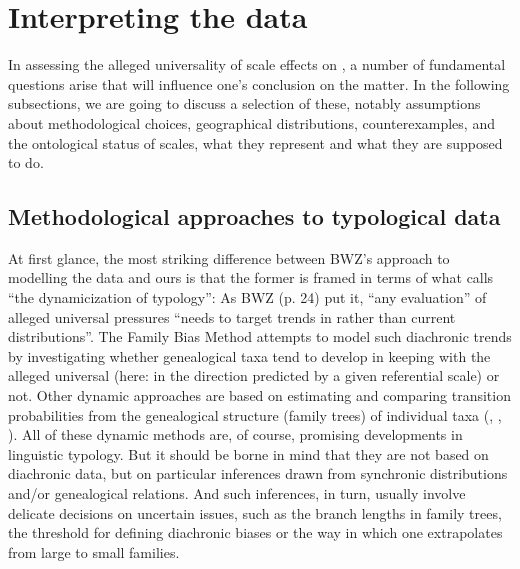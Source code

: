 \documentclass[output=paper]{langscibook}
\begin{document}
\section{Interpreting the data}
\label{18-sc-sec:4}

In assessing the alleged universality of scale effects on , a number of fundamental questions arise that will influence one’s conclusion on the matter. In the following subsections, we are going to discuss a selection of these, notably assumptions about methodological choices, geographical distributions, counterexamples, and the ontological status of scales, \ie what they represent and what they are supposed to do.

\subsection{Methodological approaches to typological data}
\label{18-sc-subsec:4-1}

At first glance, the most striking difference between BWZ’s approach to modelling the data and ours is that the former is framed in terms of what \citet{Greenberg1978Diachrony} calls “the dynamicization of typology”: As BWZ (p. 24) put it, “any evaluation” of alleged universal pressures “needs to target trends in  rather than current distributions”. The Family Bias Method attempts to model such diachronic trends by investigating whether genealogical taxa tend to develop in keeping with the alleged universal (here: in the direction predicted by a given referential scale) or not. Other dynamic approaches are based on estimating and comparing transition probabilities from the genealogical structure (\ie family trees) of individual taxa (\cf, \eg, \citealt{Cysouw2011Understanding,Dunnetal2011Evolved,Bickeletal2015Neurophysiology}). All of these dynamic methods are, of course, promising developments in linguistic typology. But it should be borne in mind that they are not based on diachronic data, but on particular inferences drawn from synchronic distributions and/or genealogical relations. And such inferences, in turn, usually involve delicate decisions on uncertain issues, such as the branch lengths in family trees, the threshold for defining diachronic biases or the way in which one extrapolates from large to small families.  
\end{document}
